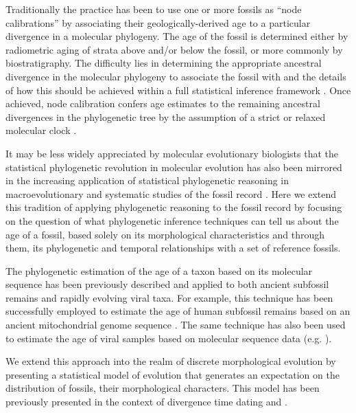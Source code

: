 \documentclass[11pt]{article}
\begin{document}
Traditionally the practice has been to use one or more fossils as ``node calibrations'' by associating their geologically-derived age to a particular divergence in a molecular phylogeny. The age of the fossil is determined either by radiometric aging of strata above and/or below the fossil, or more commonly by biostratigraphy. 
The difficulty lies in determining the appropriate ancestral divergence in the molecular phylogeny to associate the fossil with and the details of how this should be achieved within a full statistical inference framework \cite{Ho2009, Heled2012, HeledDrummond2015}.
Once achieved, node calibration confers age estimates to the remaining ancestral divergences in the phylogenetic tree by the assumption of a strict or relaxed molecular clock \cite{Thorne1998,thorne2005,yang2006,Drummond2006,drummond2010}. 

It may be less widely appreciated by molecular evolutionary biologists that the statistical phylogenetic revolution in molecular evolution has also been mirrored in the increasing application of statistical phylogenetic reasoning in macroevolutionary and systematic studies of the fossil record \cite{Foote1996,huelsenbeck1997maximum, tavare2002using, WagnerMarcot2013}. 
Here we extend this tradition of applying phylogenetic reasoning to the fossil record by focusing on the question of what phylogenetic inference techniques can tell us about the age of a fossil, based solely on its morphological characteristics and through them, its phylogenetic and temporal relationships with a set of reference fossils.



The phylogenetic estimation of the age of a taxon based on its molecular sequence has been previously described \cite{drummond2002computational,shapiro2011bayesian} and applied to both ancient subfossil remains and rapidly evolving viral taxa. 
For example, this technique has been successfully employed to estimate the age of human subfossil remains based on an ancient mitochondrial genome sequence \cite{meyer2014mitochondrial}. 
The same technique has also been used to estimate the age of viral samples based on molecular sequence data (e.g. \cite{gray2013evolutionary}).

We extend this approach into the realm of discrete morphological evolution by presenting a statistical model of evolution that generates an expectation on the distribution of fossils, their morphological characters. 
This model has been previously presented in the context of divergence time dating \cite{gavr2014,gavryushkina2015bayesian} and \cite{zhang2016}. 
\end{document}
